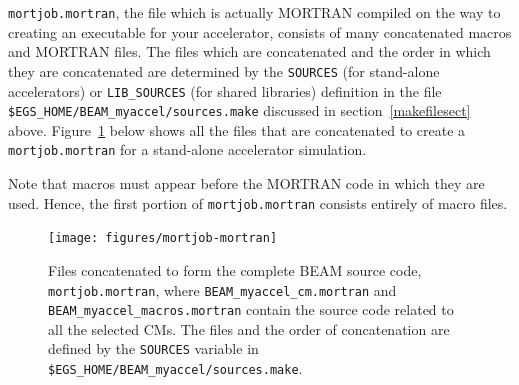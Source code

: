\documentclass[12pt,twoside]{article}
\begin{document}
{\tt mortjob.mortran}, the file which is actually MORTRAN compiled on the
way to creating an executable for your accelerator, consists of
many concatenated macros and MORTRAN files.  The files which are concatenated
and the order in which they are concatenated are determined by the
{\tt SOURCES} (for stand-alone accelerators) or
{\tt LIB\_SOURCES} (for shared libraries) definition in the file
{\tt \$EGS\_HOME/BEAM\_myaccel/sources.make}
discussed in section~\ref{makefilesect} above.  Figure~\ref{fig_mortjob}
below shows all the files that are concatenated to create a {\tt mortjob.mortran} for a stand-alone accelerator simulation.

Note that macros must appear before the MORTRAN code in which they are
used.  Hence, the first portion of {\tt mortjob.mortran} consists entirely
of macro files.

\begin{figure}[htb]
\begin{center}
\leavevmode
\mbox{}\hspace{0cm}
  
 
  
\texttt{[image: figures/mortjob-mortran]}
\caption[Files making up the complete BEAM source code.]
{Files concatenated to form the complete BEAM source code,
{\tt mortjob.mortran}, where {\tt BEAM\_myaccel\_cm.mortran}
and {\tt BEAM\_myaccel\_macros.mortran} contain
the source code related to all the selected CMs.  The files and
the order of concatenation are defined by the {\tt SOURCES} variable
in {\tt \$EGS\_HOME/BEAM\_myaccel/sources.make}.}
\label{fig_mortjob}
\end{center}
\end{figure}
\end{document}
